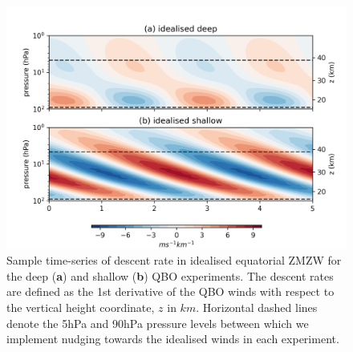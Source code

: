 \begin{figure}[h!]
\begin{center}
\noindent\includegraphics[width = \linewidth]{Figures/Figures-deepQBO/Idealised_QBO_descent_rates.png}
\caption[Idealised QBO descent rates]{Sample time-series of descent rate in idealised equatorial ZMZW for the deep (\textbf{a}) and shallow (\textbf{b}) QBO experiments. The descent rates are defined as the 1st derivative of the QBO winds with respect to the vertical height coordinate, $z$ in $km$. Horizontal dashed lines denote the 5hPa and 90hPa pressure levels between which we implement nudging towards the idealised winds in each experiment.}
\label{fig:Idealised_descent_rates}
\end{center}
\end{figure}

